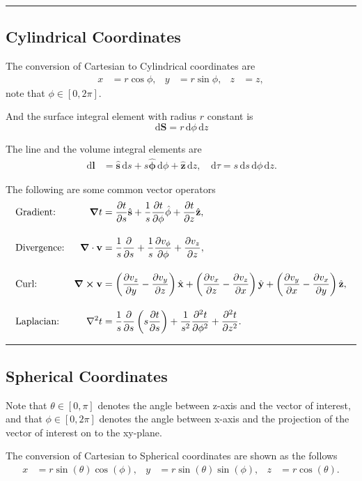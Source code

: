 \documentclass[12pt,english]{article}
\newcommand{\dmr}[1]{\, \mathrm{d}#1} %
\numberwithin{equation}{subsection}
\let\oldhat\hat
\renewcommand{\vec}[1]{\mathbf{#1}}
\renewcommand{\hat}[1]{\oldhat{\mathbf{#1}}}
\begin{document}
\par\noindent\rule{\textwidth}{0.4pt}
\subsection{Cylindrical Coordinates}
The conversion of Cartesian to Cylindrical coordinates\cite{noauthor_cylindrical_2021} are 
\begin{align*}
    x &= r \cos \phi, & y &= r \sin\phi, & z &= z,
\end{align*}
note that $\phi \in [0,2\pi].$

And the surface integral element with radius $r$ constant is
\[
    \dmr{\vec{S}}    = r \dmr{\phi}\dmr{z}
\]    

The line and the volume integral elements are
\begin{align*}
    \dmr{\vec{l}} &= \hat{s}\dmr{s} + s\hat{\phi}\dmr{\phi}+\hat{z}\dmr{z}, & \dmr{\tau} = s\dmr{s}\dmr{\phi}\dmr{z}.
\end{align*}

The following are some common vector operators
\begin{align*}
    &\text{Gradient:} &\grad t  &= \pdv{t}{s}\hat{s}+\frac{1}{s}\pdv{t}{\phi}\hat{\phi}+\pdv{t}{z}\hat{z},\\[1em]
    &\text{Divergence:} &\grad\cdot\vec{v} &= \frac{1}{s}\pdv{}{s}(sv_s)+\frac{1}{s}\pdv{v_\phi}{\phi}+\pdv{v_z}{z},\\[1em]
    &\text{Curl:} &\grad \cross \vec{v} &= \left(\pdv{v_z}{y}-\pdv{v_y}{z}\right)\hat{x} + \left(\pdv{v_x}{z}-\pdv{v_z}{x}\right)\hat{y} + \left(\pdv{v_y}{x}-\pdv{v_x}{y}\right)\hat{z},\\[1em]
    &\text{Laplacian:} &\laplacian t &= \frac{1}{s}\pdv{}{s}\left(s\pdv{t}{s}\right)+\frac{1}{s^2}\pdv[2]{t}{\phi}+\pdv[2]{t}{z}. 
\end{align*}
\par\noindent\rule{\textwidth}{0.4pt}

\subsection{Spherical Coordinates}
Note that $\theta\in[0,\pi]$ denotes the angle between z-axis and the vector of interest, and that $\phi\in[0, 2\pi]$ denotes the angle between x-axis and the projection of the vector of interest on to the xy-plane.\cite{noauthor_cylindrical_2021}

The conversion of Cartesian to Spherical coordinates are shown as the follows
\begin{align*}
    x &= r \sin(\theta)\cos(\phi), & y &= r \sin(\theta)\sin(\phi), & z &= r \cos(\theta).\\
\end{align*}
\end{document}
